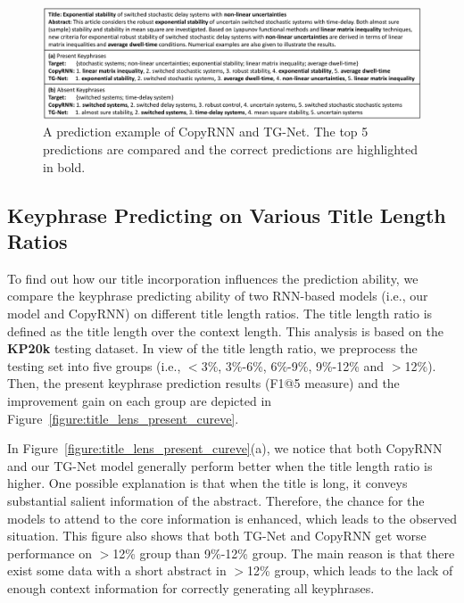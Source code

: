 \documentclass[letterpaper]{article} %
\begin{document}
\begin{figure}
\centering
\includegraphics[width=6.9in]{figures/PaperID3210_TGNet_final_case_study_cmyk.pdf}
\caption{A prediction example of CopyRNN and TG-Net. The top 5 predictions are compared and the correct predictions are highlighted in bold.}
\label{figure:case_study}
\end{figure}

\subsection{Keyphrase Predicting on Various Title Length Ratios}
To find out how our title incorporation influences the prediction ability, we compare the keyphrase predicting ability of two RNN-based models (i.e., our model and CopyRNN) on different title length ratios. The title length ratio is defined as the title length over the context length. This analysis is based on the \textbf{KP20k} testing dataset. In view of the title length ratio, we preprocess the testing set into five groups (i.e., $<$3\%, 3\%-6\%, 6\%-9\%, 9\%-12\% and $>$12\%). Then, the present keyphrase prediction results (F1@5 measure) and the improvement gain on each group are depicted in Figure~\ref{figure:title_lens_present_cureve}.


In Figure~\ref{figure:title_lens_present_cureve}(a), we notice that both CopyRNN and our TG-Net model generally perform better when the title length ratio is higher. One possible explanation is that when the title is long, it conveys substantial salient information of the abstract. Therefore, the chance for the models to attend to the core information is enhanced, which leads to the observed situation. This figure also shows that both TG-Net and CopyRNN get worse performance on $>$12\% group than 9\%-12\% group. The main reason is that there exist some data with a short abstract in $>$12\% group, which leads to the lack of enough context information for correctly generating all keyphrases.
\end{document}
